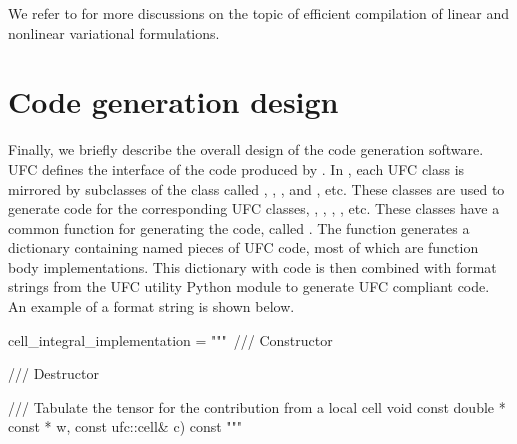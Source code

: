 We refer to
\citet{AlnaesMardal2009b,OelgaardLoggWells2008,KirbyLogg2008,OelgaardWells2010}
for more discussions on the topic of efficient compilation of linear
and nonlinear variational formulations.

\section{Code generation design}

Finally, we briefly describe the overall design of the code
generation software.  UFC defines the interface of the code produced
by \sfc{}.  In \sfc{}, each UFC class is mirrored by subclasses of the
class  called , ,
, and , etc.  These classes
are used to generate code for the corresponding UFC classes, ,
, , , etc. These
classes have a common function for generating the code, called\break
{}.  The function 
generates a dictionary containing named pieces of UFC code, most of
which are function body implementations.  This dictionary with code is
then combined with format strings from the UFC utility Python module
to generate UFC compliant code.  An example of a format string is
shown below.

\begin{python}
cell_integral_implementation = """\
/// Constructor
{
}

/// Destructor
{
}

/// Tabulate the tensor for the contribution from a local cell
void %
                                    const double * const * w,
                                    const ufc::cell& c) const
{
}
"""
\end{python}

\pagebreak

